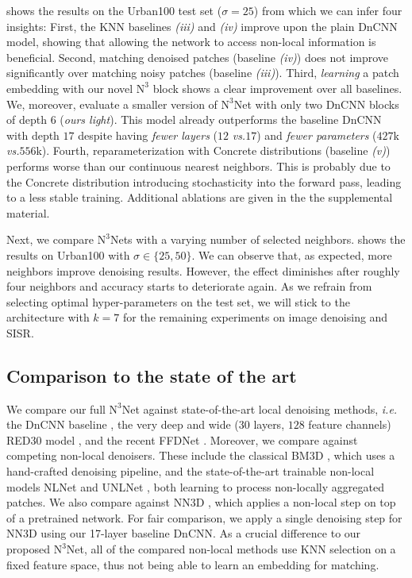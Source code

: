 \documentclass{article}
\makeatletter
\newcommand{\vs}{\emph{vs.}\@\xspace}
\newcommand{\ie}{\emph{i.\thinspace{}e.}\@\xspace}
\newcommand\kk{k}
\newcommand\nnn{\text{N}^3}
\makeatother
\begin{document}
 shows the results on the Urban100 test set ($\sigma=25$) from which we can infer four insights:
First, the KNN baselines \emph{(iii)} and \emph{(iv)} improve upon the plain DnCNN model, showing that allowing the network to access non-local information is beneficial.
Second, matching denoised patches (baseline \emph{(iv)}) does not improve significantly over matching noisy patches (baseline \emph{(iii)}).
Third, \emph{learning} a patch embedding with our novel $\nnn$ block shows a clear improvement over all baselines.
 We, moreover, evaluate a smaller version of $\nnn$Net with only two DnCNN blocks of depth $6$ (\emph{ours light}). 
This model already outperforms the baseline DnCNN with depth $17$ despite having \emph{fewer layers} ($12$ \vs $17$) and \emph{fewer parameters} ($427$k \vs $556$k).
Fourth, reparameterization with Concrete distributions (baseline \emph{(v)}) performs worse than our continuous nearest neighbors. 
This is probably due to the Concrete distribution introducing stochasticity into the forward pass, leading to a less stable training.
Additional ablations are given in the the supplemental material.


Next, we compare $\nnn$Nets with a varying number of selected neighbors. 
 shows the results on Urban100 with $\sigma \in \{25,50\}$. 
We can observe that, as expected, more neighbors improve denoising results.
However, the effect diminishes after roughly four neighbors and accuracy starts to deteriorate again.
As we refrain from selecting optimal hyper-parameters on the test set, we will stick to the architecture with $\kk=7$ for the remaining experiments on image denoising and SISR.
 

\subsection{Comparison to the state of the art}
We compare our full $\nnn$Net
against state-of-the-art local denoising methods, \ie 
the DnCNN baseline \cite{Zhang:2017:BGD}, the very deep and wide ($30$ layers, $128$ feature channels) RED30 model \cite{Mao:2016:IRU}, and the recent FFDNet \cite{Zhang:2018:FFD}.
 Moreover, we compare against competing non-local denoisers.
These include the classical BM3D \cite{Dabov:2006:IDB}, which uses a hand-crafted
denoising pipeline, and the state-of-the-art trainable non-local models NLNet \cite{Lefkimmiatis:2017:NLC} and UNLNet \cite{Lefkimmiatis:2018:UDN},
both learning to process non-locally aggregated patches.
We also compare against NN3D \cite{Cruz:2018:NRC}, which applies a non-local step on top of a pretrained network. 
For fair comparison, we apply a single denoising step for NN3D using our 17-layer baseline DnCNN.
As a crucial difference to our proposed $\nnn$Net, all of the compared non-local methods use KNN selection on a fixed feature space, thus not being able to learn an embedding for matching. 
\end{document}
